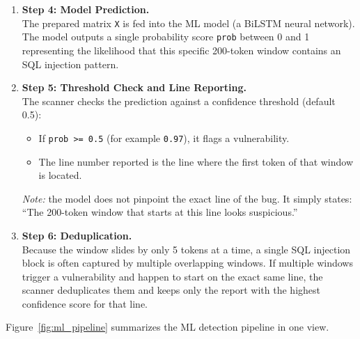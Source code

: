\begin{enumerate}
  \item \textbf{Step 4: Model Prediction.}\\
  The prepared matrix \texttt{X} is fed into the ML model (a BiLSTM neural network). The
  model outputs a single probability score \texttt{prob} between 0 and 1 representing the
  likelihood that this specific 200-token window contains an SQL injection pattern.

  \item \textbf{Step 5: Threshold Check and Line Reporting.}\\
  The scanner checks the prediction against a confidence threshold (default 0.5):
  \begin{itemize}
    \item If \texttt{prob >= 0.5} (for example \texttt{0.97}), it flags a vulnerability.
    \item The line number reported is the line where the first token of that window is located.
  \end{itemize}
  \textit{Note:} the model does not pinpoint the exact line of the bug. It simply states:
  ``The 200-token window that starts at this line looks suspicious.''

  \item \textbf{Step 6: Deduplication.}\\
  Because the window slides by only 5 tokens at a time, a single SQL injection block
  is often captured by multiple overlapping windows. If multiple windows trigger a
  vulnerability and happen to start on the exact same line, the scanner deduplicates them
  and keeps only the report with the highest confidence score for that line.
\end{enumerate}

Figure~\ref{fig:ml_pipeline} summarizes the ML detection pipeline in one view.

